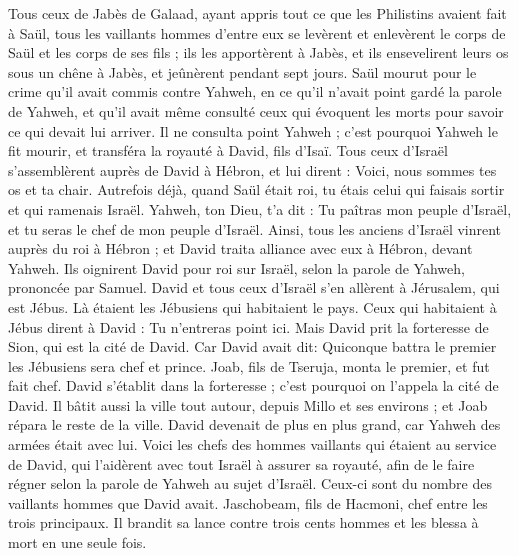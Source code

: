\begin{multicols}{2}
Tous ceux de Jabès de Galaad, ayant appris tout ce que les Philistins avaient fait à Saül,
tous les vaillants hommes d'entre eux se levèrent et enlevèrent le corps de Saül et les corps de ses fils ; ils les apportèrent à Jabès, et ils ensevelirent leurs os sous un chêne à Jabès, et jeûnèrent pendant sept jours.
Saül mourut pour le crime qu'il avait commis contre Yahweh, en ce qu'il n'avait point gardé la parole de Yahweh, et qu'il avait même consulté ceux qui évoquent les morts pour savoir ce qui devait lui arriver.
Il ne consulta point Yahweh ; c'est pourquoi Yahweh le fit mourir, et transféra la royauté à David, fils d'Isaï.
\VerseOne{}Tous ceux d'Israël s'assemblèrent auprès de David à Hébron, et lui dirent : Voici, nous sommes tes os et ta chair.
Autrefois déjà, quand Saül était roi, tu étais celui qui faisais sortir et qui ramenais Israël. Yahweh, ton Dieu, t'a dit : Tu paîtras mon peuple d'Israël, et tu seras le chef de mon peuple d'Israël.
Ainsi, tous les anciens d'Israël vinrent auprès du roi à Hébron ; et David traita alliance avec eux à Hébron, devant Yahweh. Ils oignirent David pour roi sur Israël, selon la parole de Yahweh, prononcée par Samuel.
David et tous ceux d'Israël s'en allèrent à Jérusalem, qui est Jébus. Là étaient les Jébusiens qui habitaient le pays.
Ceux qui habitaient à Jébus dirent à David : Tu n'entreras point ici. Mais David prit la forteresse de Sion, qui est la cité de David.
Car David avait dit: Quiconque battra le premier les Jébusiens sera chef et prince. Joab, fils de Tseruja, monta le premier, et fut fait chef.
David s'établit dans la forteresse ; c'est pourquoi on l'appela la cité de David.
Il bâtit aussi la ville tout autour, depuis Millo et ses environs ; et Joab répara le reste de la ville.
David devenait de plus en plus grand, car Yahweh des armées était avec lui.
Voici les chefs des hommes vaillants qui étaient au service de David, qui l'aidèrent avec tout Israël à assurer sa royauté, afin de le faire régner selon la parole de Yahweh au sujet d'Israël.
Ceux-ci sont du nombre des vaillants hommes que David avait. Jaschobeam, fils de Hacmoni, chef entre les trois principaux. Il brandit sa lance contre trois cents hommes et les blessa à mort en une seule fois.

\end{multicols}
